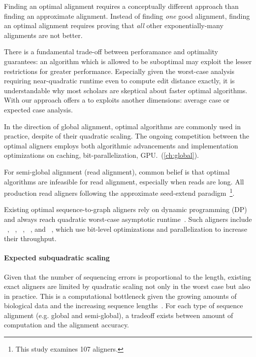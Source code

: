Finding an optimal alignment requires a conceptually different approach than
finding an approximate alignment. Instead of finding \emph{one} good alignment,
finding an optimal alignment requires proving that \emph{all} other
exponentially-many alignments are not better.

There is a fundamental trade-off between perforamance and optimality guarantees:
an algorithm which is allowed to be suboptimal may exploit the lesser
restrictions for greater performance. Especially given the worst-case analysis
requiring near-quadratic runtime even to compute edit distance exactly, it is
understandable why most scholars are skeptical about faster optimal algorithms.
With our \A approach offers a to exploits another dimensions: average case or
expected case analysis.

In the direction of global alignment, optimal algorithms are commonly used in
practice, despite of their quadratic scaling. The ongoing competition between
the optimal aligners employs both algorithmic advancements and implementation
optimizations on caching, bit-parallelization, GPU.~(\cref{ch:global}).

For semi-global alignment (read alignment), common belief is that optimal
algorithms are infeasible for read alignment, especially when reads are long.
All production read aligners following the approximate seed-extend
paradigm~\cite{alser2021technology}\footnote{This study examines 107 aligners.}.

Existing optimal sequence-to-graph aligners rely on dynamic programming (DP) and
always reach quadratic worst-case asymptotic runtime~\citep{equi2019complexity}.
Such aligners include \vargas~\citep{darby2020vargas},
\pasgal~\citep{jain_accelerating_2019},
\graphaligner~\citep{rautiainen_bitparallel_2019},
\hga~\citep{feng2021accelerating}, and \vg~\citep{garrison_variation_2018},
which use bit-level optimizations and parallelization to increase their
throughput.

\paragraph{Expected subquadratic scaling}

Given that the number of sequencing errors is proportional to the length,
existing exact aligners are limited by quadratic scaling not only in the worst
case but also in practice. This is a computational bottleneck given the growing
amounts of biological data and the increasing sequence
lengths~\citep{kucherov2019evolution}. For each type of sequence alignment (e.g.
global and semi-global), a tradeoff exists between amount of computation and the
alignment accuracy.

